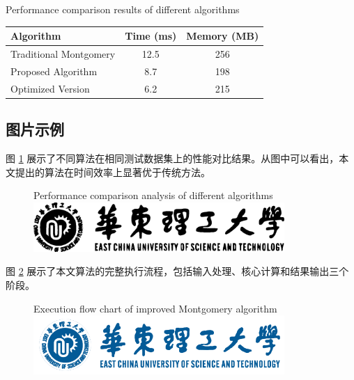 \begin{table}[htbp]
	\centering
	{Performance comparison results of different algorithms} %
	\label{tab:performance_comparison} %
	
	\begin{tabular}{lS[table-format=2.1]S[table-format=3.0]} %
		\toprule
		{Algorithm} & {Time (ms)} & {Memory (MB)} \\ %
		\midrule
		Traditional Montgomery & 12.5 & 256 \\
		Proposed Algorithm & 8.7 & 198 \\
		Optimized Version & 6.2 & 215 \\
		\bottomrule
	\end{tabular}
\end{table}

\subsection{图片示例}

图 \ref{fig:performance_comparison} 展示了不同算法在相同测试数据集上的性能对比结果。从图中可以看出，本文提出的算法在时间效率上显著优于传统方法。

\begin{figure}[htbp]
	\centering
	{Performance comparison analysis of different algorithms} %
	\label{fig:performance_comparison} %
	\includegraphics[width=0.85\textwidth]{figures/figure2.eps} %
\end{figure}

图 \ref{fig:algorithm_flow} 展示了本文算法的完整执行流程，包括输入处理、核心计算和结果输出三个阶段。

\begin{figure}[H] %
	\centering
	{Execution flow chart of improved Montgomery algorithm} %
	\label{fig:algorithm_flow} %
	\includegraphics[width=0.85\textwidth]{figures/ECUST-logo.png} %
	\end{figure}
	
